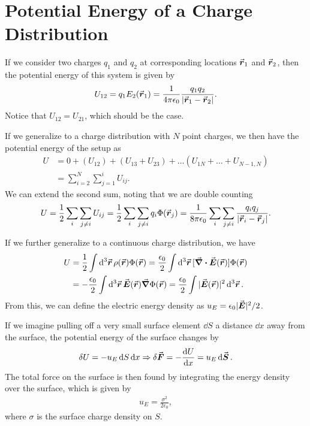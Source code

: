 \section{Potential Energy of a Charge Distribution}

If we consider two charges $q_1$ and $q_2$ at corresponding locations $\va*{r}_{1}$ and $\va*{r}_{2}$, then the potential energy of this system is given by
\begin{eqnarray}
    U_{12} = q_{1} E_{2}(\va*{r}_{1}) = \frac{1}{4 \pi \epsilon_0} \frac{q_1 q_2}{|\va*{r}_{1} - \va*{r}_{2}|}
.\end{eqnarray}
Notice that $U_{12} = U_{21}$, which should be the case.

If we generalize to a charge distribution with $N$ point charges, we then have the potential energy of the setup as 
\begin{align}
    U &= 0 + (U_{12}) + (U_{13} + U_{23}) + \ldots (U_{1N} + \ldots + U_{N-1,N}) \nonumber \\
               &= \sum_{i=2}^{N} \sum_{j = 1}^{i} U_{ij} 
.\end{align}
We can extend the second sum, noting that we are double counting
\begin{eqnarray}
    U = \frac{1}{2} \sum_{i} \sum_{j \ne i} U_{ij} = \frac{1}{2} \sum_{i} \sum_{j \ne i} q_{i} \Phi(\va*{r}_{j}) = \frac{1}{8 \pi \epsilon_0} \sum_{i} \sum_{j \ne i} \frac{q_{i} q_{j}}{|\va*{r}_{i} - \va*{r}_{j}|}
.\end{eqnarray}

If we further generalize to a continuous charge distribution, we have
\begin{align}
    U &= \frac{1}{2} \int \dd[3]{\va*{r}} \rho(\va*{r}) \Phi(\va*{r}) = \frac{\epsilon_0}{2} \int \dd[3]{\va*{r}} [\div{\va*{E}(\va*{r})}] \Phi(\va*{r}) \\
      &= - \frac{\epsilon_0}{2} \int \dd[3]{\va*{r}} \va*{E}(\va*{r}) \grad \Phi(\va*{r}) = \frac{\epsilon_0}{2} \int |\va*{E}(\va*{r})|^2 \dd[3]{\va*{r}}
.\end{align}
From this, we can define the electric energy density as $u_{E} = \epsilon_0 |\va*{E}|^2/2$.

If we imagine pulling off a very small surface element $\dd{S}$ a distance $\dd{x}$ away from the surface, the potential energy of the surface changes by 
\begin{eqnarray}
    \delta{U} = -u_{E} \dd{S} \dd{x} \Rightarrow \delta\va*{F} = -\dv{U}{x} = u_{E} \dd{\va*{S}}
.\end{eqnarray}
The total force on the surface is then found by integrating the energy density over the surface, which is given by
\begin{eqnarray}
    u_{E} = \frac{\sigma^2}{2 \epsilon_0}
,\end{eqnarray}
where $\sigma$ is the surface charge density on $S$.

